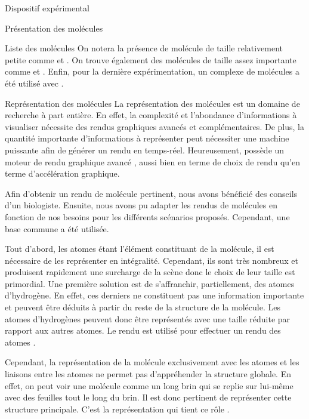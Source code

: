 \documentclass[myfrancais,ngerman,english,frenchb]{mythesis}
\begin{document}
\begin{mychapter}{Dispositif expérimental}
\begin{mysection}{Présentation des molécules}
\begin{mysubsection}{Liste des molécules}
				On notera la présence de molécule de taille relativement petite comme \myTRPZIPPER et \myTRPCAGE.
				On trouve également des molécules de taille assez importante comme \myPrion et \myUbiquitin.
				Enfin, pour la dernière expérimentation, un complexe de molécules a été utilisé avec \myNusENusG.
			\end{mysubsection}
			\begin{mysubsection}{Représentation des molécules}
				La représentation des molécules est un domaine de recherche à part entière.
				En effet, la complexité et l'abondance d'informations à visualiser nécessite des rendus graphiques avancés et complémentaires.
				De plus, la quantité importante d'informations à représenter peut nécessiter une machine puissante afin de générer un rendu en temps-réel.
				Heureusement,  possède un moteur de rendu graphique avancé , aussi bien en terme de choix de rendu qu'en terme d'accélération graphique.

				Afin d'obtenir un rendu de molécule pertinent, nous avons bénéficié des conseils d'un biologiste.
				Ensuite, nous avons pu adapter les rendus de molécules en fonction de nos besoins pour les différents scénarios proposés.
				Cependant, une base commune a été utilisée.

				Tout d'abord, les atomes étant l'élément constituant de la molécule, il est nécessaire de les représenter en intégralité.
				Cependant, ils sont très nombreux et produisent rapidement une surcharge de la scène donc le choix de leur taille est primordial.
				Une première solution est de s'affranchir, partiellement, des atomes d'hydrogène.
				En effet, ces derniers ne constituent pas une information importante et peuvent être déduits à partir du reste de la structure de la molécule.
				Les atomes d'hydrogènes peuvent donc être représentés avec une taille réduite par rapport aux autres atomes.
				Le rendu \myCPK est utilisé pour effectuer un rendu des atomes .

				\begin{myfigure}
				\end{myfigure}

				Cependant, la représentation de la molécule exclusivement avec les atomes et les liaisons entre les atomes ne permet pas d'appréhender la structure globale.
				En effet, on peut voir une molécule comme un long brin qui se replie sur lui-même avec des feuilles tout le long du brin.
				Il est donc pertinent de représenter cette structure principale.
				C'est la représentation \myNewRibbon qui tient ce rôle .


\end{mysubsection}
\end{mysection}
\end{mychapter}
\end{document}
